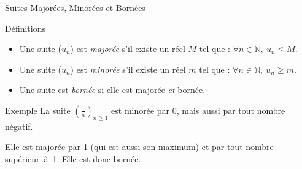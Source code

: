 \documentclass{coursbook}
\begin{document}
    \begin{Gpartie}{Suites Majorées, Minorées et Bornées} 
        \begin{Spartie}{Définitions} 
            \begin{itemize}
                \item Une suite ($u_n$) est \emph{majorée} s'il existe un réel $M$ tel que : $\forall n\in\mathbb{N},~u_n\leq M$.
                \item Une suite ($u_n$) est \emph{minorée} s'il existe un réel $m$ tel que : $\forall n\in\mathbb{N},~u_n\geq m$.
                \item Une suite est \emph{bornée} si elle est majorée \emph{et} bornée.
            \end{itemize}
        \end{Spartie}
        \begin{Spartie}{Exemple} 
            La suite $\left(\frac{1}{n}\right)_{n\geq 1}$ est minorée par 0, mais aussi par tout nombre négatif. 
            
            Elle est majorée par 1 (qui est aussi son maximum) et par tout nombre supérieur~à~1. Elle est donc bornée.
        \end{Spartie}
    \end{Gpartie}
\end{document}
